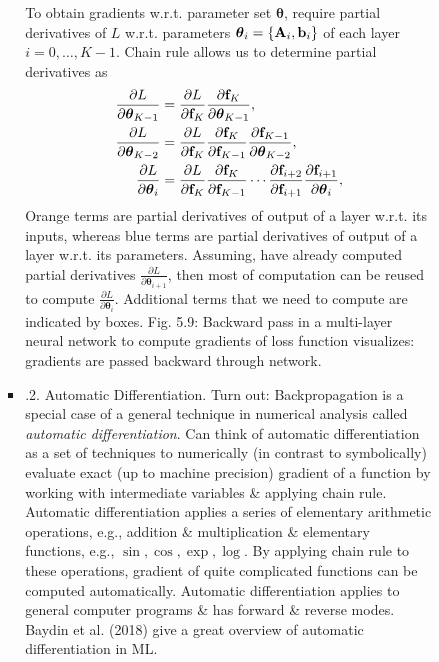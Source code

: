 \documentclass{article}
\begin{document}
\begin{enumerate}
\begin{itemize}
\begin{itemize}
\begin{itemize}
				To obtain gradients w.r.t. parameter set $\boldsymbol{\theta}$, require partial derivatives of $L$ w.r.t. parameters $\boldsymbol{\theta}_i = \{{\bf A}_i,{\bf b}_i\}$ of each layer $i = 0,\ldots,K - 1$. Chain rule allows us to determine partial derivatives as
				\begin{align}
					\frac{\partial L}{\partial\boldsymbol{\theta}_{K-1}} &= \frac{\partial L}{\partial{\bf f}_K}\frac{\partial{\bf f}_K}{\partial\boldsymbol{\theta}_{K-1}},\\
					\frac{\partial L}{\partial\boldsymbol{\theta}_{K-2}} &= \frac{\partial L}{\partial{\bf f}_K}\frac{\partial{\bf f}_K}{\partial{\bf f}_{K-1}}\frac{\partial{\bf f}_{K-1}}{\partial\boldsymbol{\theta}_{K-2}},\\
					\frac{\partial L}{\partial\boldsymbol{\theta}_i} &= \frac{\partial L}{\partial{\bf f}_K}\frac{\partial{\bf f}_K}{\partial{\bf f}_{K-1}}\cdots\frac{\partial{\bf f}_{i+2}}{\partial{\bf f}_{i+1}}\frac{\partial{\bf f}_{i+1}}{\partial\boldsymbol{\theta}_i},\\
				\end{align}
				Orange terms are partial derivatives of output of a layer w.r.t. its inputs, whereas blue terms are partial derivatives of output of a layer w.r.t. its parameters. Assuming, have already computed partial derivatives $\frac{\partial L}{\partial\boldsymbol{\theta}_{i+1}}$, then most of computation can be reused to compute $\frac{\partial L}{\partial\boldsymbol{\theta}_i}$. Additional terms that we need to compute are indicated by boxes. {\sf Fig. 5.9: Backward pass in a multi-layer neural network to compute gradients of loss function} visualizes: gradients are passed backward through network.
				\item {.2. Automatic Differentiation.} Turn out: Backpropagation is a special case of a general technique in numerical analysis called {\it automatic differentiation}. Can think of automatic differentiation as a set of techniques to numerically (in contrast to symbolically) evaluate exact (up to machine precision) gradient of a function by working with intermediate variables \& applying chain rule. Automatic differentiation applies a series of elementary arithmetic operations, e.g., addition \& multiplication \& elementary functions, e.g., $\sin,\cos,\exp,\log$. By applying chain rule to these operations, gradient of quite complicated functions can be computed automatically. Automatic differentiation applies to general computer programs \& has forward \& reverse modes. Baydin et al. (2018) give a great overview of automatic differentiation in ML.
				

\end{itemize}
\end{itemize}
\end{itemize}
\end{enumerate}
\end{document}
